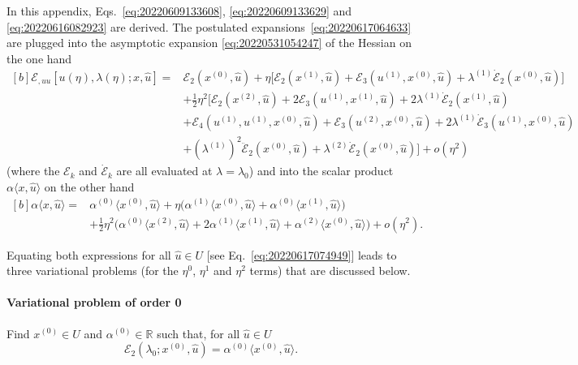 \documentclass[12pt, final]{scrartcl}
\theoremstyle{definition}
\newcommand{\E}{\mathcal E}
\newcommand{\order}[2][1]{#2^{(#1)}}
\newcommand{\reals}{\mathbb{R}}
\begin{document}
In this appendix, Eqs.~\eqref{eq:20220609133608}, \eqref{eq:20220609133629} and
\eqref{eq:20220616082923} are derived. The postulated
expansions~\eqref{eq:20220617064633} are plugged into the asymptotic expansion
\eqref{eq:20220531054247} of the Hessian on the one hand
\begin{equation*}
  \begin{aligned}[b]
    \E_{, uu} [u(\eta), \lambda(\eta); x, \hat{u}] ={}
    & \E_2(\order[0]x, \hat{u}) + \eta \bigl[ \E_2(\order[1]x, \hat{u}) + \E_3(\order[1]u, \order[0]x, \hat{u}) + \order[1]\lambda \dot{\E}_2(\order[0]x, \hat{u})\bigr]\\
    & + \tfrac{1}{2} \eta^2 \bigl[\E_2(\order[2]x, \hat{u}) + 2\E_3(\order[1]u, \order[1]x, \hat{u}) + 2 \order[1]\lambda \dot{\E}_2(\order[1]x, \hat{u})\\
    & + \E_4(\order[1]u, \order[1]u, \order[0]x, \hat{u}) + \E_3(\order[2]u, \order[0]x, \hat{u}) + 2\order[1]\lambda \dot{\E}_3(\order[1]u, \order[0]x, \hat{u})\\
    & + ( \order[1]\lambda )^2 \ddot{\E}_2(\order[0]x, \hat{u}) + \order[2]\lambda \dot{\E}_2(\order[0]x, \hat{u}) \bigr] + o(\eta^2)
  \end{aligned}
\end{equation*}
(where the $\E_k$ and $\dot{\E}_k$ are all evaluated at $\lambda=\lambda_0$) and into the
scalar product $α \langle x, \hat{u} \rangle$ on the other hand
\begin{equation*}
  \begin{aligned}[b]
    α \langle x, \hat{u} \rangle ={}
    & \order[0]α \langle \order[0]x, \hat{u} \rangle + \eta \bigl(\order[1]α \langle \order[0]x, \hat{u} \rangle + \order[0]α \langle \order[1]x, \hat{u} \rangle\bigr)\\
    & + \tfrac{1}{2} \eta^2 \bigl(\order[0]α \langle \order[2]x, \hat{u} \rangle + 2 \order[1]α \langle \order[1]x, \hat{u} \rangle + \order[2]α \langle \order[0]x, \hat{u} \rangle\bigr) + o(\eta^2).
  \end{aligned}
\end{equation*}

Equating both expressions for all $\hat{u} \in U$ [see
Eq.~\eqref{eq:20220617074949}] leads to three variational problems (for the
$\eta^0$, $\eta^1$ and $\eta^2$ terms) that are discussed below.

\paragraph{Variational problem of order 0} Find $\order[0]x \in U$ and $\order[0]α\in\reals$ such
that, for all $\hat{u} \in U$
\begin{equation*}
  \E_2(\lambda_0; \order[0]x, \hat{u}) = \order[0]α \langle \order[0]x, \hat{u} \rangle.
\end{equation*}
\end{document}
